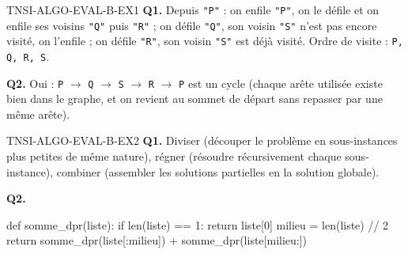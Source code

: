 \begin{corrige}{TNSI-ALGO-EVAL-B-EX1}
\textbf{Q1.} Depuis \texttt{"P"} : on enfile \texttt{"P"}, on le défile et on enfile ses voisins \texttt{"Q"} puis \texttt{"R"} ; on défile \texttt{"Q"}, son voisin \texttt{"S"} n'est pas encore visité, on l'enfile ; on défile \texttt{"R"}, son voisin \texttt{"S"} est déjà visité. Ordre de visite : \texttt{P, Q, R, S}.

\textbf{Q2.} Oui : \texttt{P} $\to$ \texttt{Q} $\to$ \texttt{S} $\to$ \texttt{R} $\to$ \texttt{P} est un cycle (chaque arête utilisée existe bien dans le graphe, et on revient au sommet de départ sans repasser par une même arête).
\end{corrige}

\begin{corrige}{TNSI-ALGO-EVAL-B-EX2}
\textbf{Q1.} Diviser (découper le problème en sous-instances plus petites de même nature), régner (résoudre récursivement chaque sous-instance), combiner (assembler les solutions partielles en la solution globale).

\textbf{Q2.}
\begin{python}
def somme_dpr(liste):
    if len(liste) == 1:
        return liste[0]
    milieu = len(liste) // 2
    return somme_dpr(liste[:milieu]) + somme_dpr(liste[milieu:])
\end{python}
\end{corrige}
